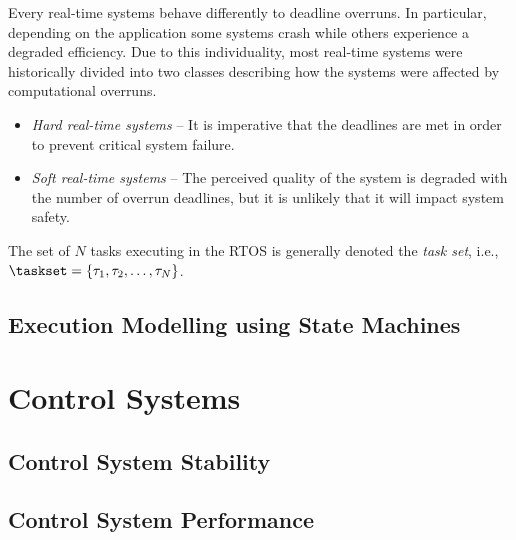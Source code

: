 Every real-time systems behave differently to deadline overruns.
In particular, depending on the application some systems crash while others experience a degraded efficiency.
Due to this individuality, most real-time systems were historically divided into two classes describing how the systems were affected by computational overruns.
%
\begin{itemize}
    \item \emph{Hard real-time systems} -- It is imperative that the deadlines are met in order to prevent critical system failure.

    \item \emph{Soft real-time systems} -- The perceived quality of the system is degraded with the number of overrun deadlines, but it is unlikely that it will impact system safety.
\end{itemize}


The set of $N$ tasks executing in the RTOS is generally denoted the \emph{task set}, i.e., $\taskset = \left\{ \tau_1, \tau_2, \ldots, \tau_N \right\}$.



\subsection{Execution Modelling using State Machines}%
\label{sec:background:fsm}%
%


\section{Control Systems}%
\label{sec:background:ctrl}%
%

\subsection{Control System Stability}%
\label{sec:background:stability}%
%

\subsection{Control System Performance}%
\label{sec:background:performance}%
%


